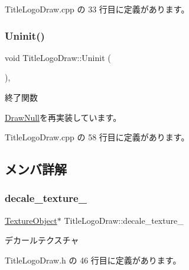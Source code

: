  Title\+Logo\+Draw.\+cpp の 33 行目に定義があります。

\mbox{\label{class_title_logo_draw_a07bbf9e8de5c7b9ee028408496c13c50}} 
\subsubsection{\texorpdfstring{Uninit()}{Uninit()}}
{\footnotesize\ttfamily void Title\+Logo\+Draw\+::\+Uninit (\begin{DoxyParamCaption}{ }\end{DoxyParamCaption})\hspace{0.3cm}{\ttfamily [override]}, {\ttfamily [virtual]}}



終了関数 



\mbox{\hyperlink{class_draw_null_a12d44e341c7364b5ab9cdd661dc16187}{Draw\+Null}}を再実装しています。



 Title\+Logo\+Draw.\+cpp の 58 行目に定義があります。



\subsection{メンバ詳解}
\mbox{\label{class_title_logo_draw_a84be55e143853754d0b5f21647e3c595}} 
\subsubsection{\texorpdfstring{decale\+\_\+texture\+\_\+}{decale\_texture\_}}
{\footnotesize\ttfamily \mbox{\hyperlink{class_texture_object}{Texture\+Object}}$\ast$ Title\+Logo\+Draw\+::decale\+\_\+texture\+\_\+\hspace{0.3cm}{\ttfamily [private]}}



デカールテクスチャ 



 Title\+Logo\+Draw.\+h の 46 行目に定義があります。

